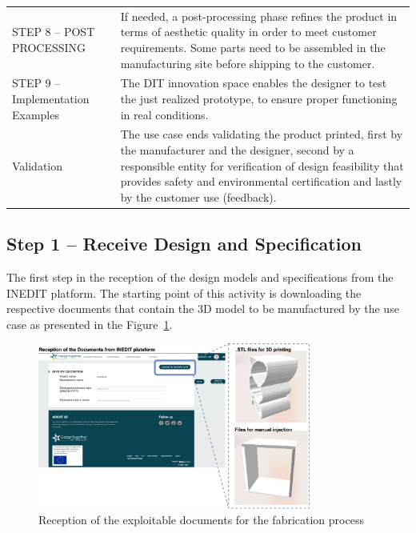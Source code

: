 \documentclass[
  11pt,
]{article}
\begin{document}
\begin{table}[H]
\begin{tabular}[t]{>{\raggedright\arraybackslash}p{4cm}>{\raggedright\arraybackslash}p{12cm}}
STEP 8 – POST PROCESSING  & If needed, a post-processing phase refines the product in terms of aesthetic quality in order to meet customer requirements. Some parts need to be assembled in the manufacturing site before shipping to the customer. \\
STEP 9 – Implementation Examples & The DIT innovation space enables the designer to test the just realized prototype, to ensure proper functioning in real conditions. 
\cellcolor{gray!6}{If the test by use of the prototype fails, the failure is improved and corrected, repeating the process (re-involving the necessary stakeholders and the technologies used). }\\
Validation & The use case ends validating the product printed, first by the manufacturer and the designer, second by a responsible entity for verification of design feasibility that provides safety and environmental certification and lastly by the customer use (feedback). \\
\bottomrule
\end{tabular}
\endgroup{}
\end{table}

\hypertarget{step-1-receive-design-and-specification}{%
\subsection{Step 1 -- Receive Design and
Specification}\label{step-1-receive-design-and-specification}}

The first step in the reception of the design models and specifications
from the INEDIT platform. The starting point of this activity is
downloading the respective documents that contain the 3D model to be
manufactured by the use case as presented in the Figure~\ref{fig-step1}.

\begin{figure}[H]

{\centering \includegraphics[width=0.8\textwidth,height=\textheight]{figures/Step-1.png}

}

\caption{\label{fig-step1}Reception of the exploitable documents for the
fabrication process}

\end{figure}
\end{document}
